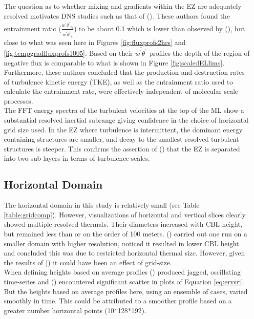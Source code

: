 The question as to whether mixing and gradients within the \acs{EZ} are adequately resolved motivates \acs{DNS}  studies such as that of \citeauthor{GarciaMellado} (\citeyear{GarciaMellado}). These authors found the entrainment ratio ($\frac{\overline{w^{'}\theta^{'}}_{z_{f}}}{\overline{w^{'}\theta^{'}}_{s}}$) to be about 0.1 which is lower than observed by \citeauthor{FedConzMir04} (\citeyear{FedConzMir04}), but close to what was seen here in Figures \ref{fig:fluxprofs2hrs} and \ref{fig:tempgradfluxprofs1005}.  Based on their $\overline{w^{'}\theta^{'}}$ profiles the depth of the region of negative flux is comparable to what is shown in Figure \ref{fig:scaledELlims}.  Furthermore, these authors concluded that the production and destruction rates of turbulence kinetic energy (\acs{TKE}), as well as the entrainment ratio used to calculate the entrainment rate, were effectively independent of molecular scale processes.\\  
  
The \acs{FFT} energy spectra of the turbulent velocities at the top of the \acs{ML} show a substantial resolved inertial subrange giving confidence in the choice of horizontal grid size used. In the \acs{EZ} where turbulence is intermittent, the dominant energy containing structures are smaller, and decay to the smallest resolved turbulent structures is steeper. This confirms the assertion of \citeauthor{GarciaMellado} (\citeyear{GarciaMellado}) that the \acs{EZ} is separated into two sub-layers in terms of turbulence scales.\\

\subsection{Horizontal Domain}

The horizontal domain in this study is relatively small (see Table \ref{table:gridcomp}). However, visualizations of horizontal and vertical slices clearly showed multiple resolved thermals.  Their diameters increased with \acs{CBL} height, but remained less than or on the order of 100 meters.  \citeauthor{SullMoengStev} (\citeyear{SullMoengStev}) carried out one run on a smaller domain with higher resolution, noticed it resulted in lower \acs{CBL} height and concluded this was due to restricted horizontal thermal size. However, given the results of \citeauthor{SullPat} (\citeyear{SullPat}) it could have been an effect of grid-size.\\   

When defining heights based on average profiles \citeauthor{SullMoengStev} (\citeyear{SullMoengStev}) produced jagged, oscillating time-series and \citeauthor{BrooksFowler2} (\citeyear{BrooksFowler2}) encountered significant scatter in plots of Equation \ref{eq:ervsri}.  But the heights based on average profiles here, using an ensemble of cases, varied smoothly in time.  This could be attributed to a smoother profile based on a greater number horizontal points (10*128*192).\\

